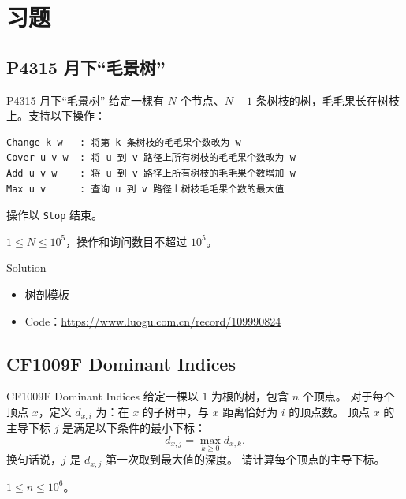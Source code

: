 ﻿\documentclass[aspectratio=169]{ctexbeamer}
\begin{document}
\section{习题}

\subsection{P4315 月下“毛景树”}
\begin{frame}[fragile]{P4315 月下“毛景树”}
    给定一棵有 $N$ 个节点、$N-1$ 条树枝的树，毛毛果长在树枝上。支持以下操作：
    \begin{verbatim}
Change k w   : 将第 k 条树枝的毛毛果个数改为 w
Cover u v w  : 将 u 到 v 路径上所有树枝的毛毛果个数改为 w
Add u v w    : 将 u 到 v 路径上所有树枝的毛毛果个数增加 w
Max u v      : 查询 u 到 v 路径上树枝毛毛果个数的最大值
    \end{verbatim}
    操作以 \texttt{Stop} 结束。

    \medskip
    $1\le N\le 10^5$，操作和询问数目不超过 $10^5$。
\end{frame}

\begin{frame}{Solution}
    \begin{itemize}
        \item 树剖模板
        \item Code：\url{https://www.luogu.com.cn/record/109990824}
    \end{itemize}
\end{frame}
\subsection{CF1009F Dominant Indices}

\begin{frame}{CF1009F Dominant Indices}
    给定一棵以 $1$ 为根的树，包含 $n$ 个顶点。
    对于每个顶点 $x$，定义 $d_{x,i}$ 为：在 $x$ 的子树中，与 $x$ 距离恰好为 $i$ 的顶点数。
    顶点 $x$ 的主导下标 $j$ 是满足以下条件的最小下标：
    \[
        d_{x,j}=\max_{k\ge 0} d_{x,k}.
    \]
    换句话说，$j$ 是 $d_{x,j}$ 第一次取到最大值的深度。
    请计算每个顶点的主导下标。

    \medskip
    $1\le n\le 10^6$。
\end{frame}
\end{document}
